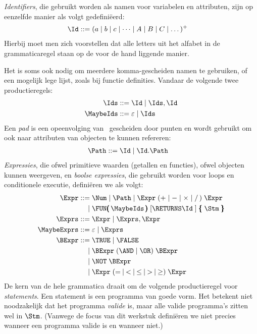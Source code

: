\emph{Identifiers}, die gebruikt worden als namen voor variabelen en attributen, zijn op eenzelfde manier als volgt gedefiniëerd:
%
\begin{align*}
  \Id \GrammarDef (a \mid b \mid c \mid \dots \mid A \mid B \mid C \mid \dots)^+
\end{align*}
%
Hierbij moet men zich voorstellen dat alle letters uit het alfabet in de grammaticaregel staan op de voor de hand liggende manier.

Het is soms ook nodig om meerdere komma-gescheiden namen te gebruiken, of een mogelijk lege lijst, zoals bij functie definities. Vandaar de volgende twee productieregels:
%
\begin{align*}
  \Ids \GrammarDef \Id \mid \Ids, \Id \\
  \MaybeIds \GrammarDef \varepsilon \mid \Ids
\end{align*}
%
Een \emph{pad} is een opeenvolging van \Ids\ gescheiden door punten en wordt gebruikt om ook naar attributen van objecten te kunnen refereren:
%
\begin{align*}
  \Path \GrammarDef \Id \mid \Id . \Path
\end{align*}
%
\emph{Expressies}, die ofwel primitieve waarden (getallen en functies), ofwel objecten kunnen weergeven, en \emph{boolse expressies}, die gebruikt worden voor loops en conditionele executie, definiëren we als volgt:
%
\begin{align*}
  \Expr \GrammarDef \Num \mid \Path \mid \Expr\; (+ \mid - \mid \times \mid /\,)\; \Expr \\
  \GrammarOr \FUN\pmb{(}\,\MaybeIds\,\pmb{)}\; \GrammarOpt{\RETURNS \Id\;} \pmb{\{}\; \Stm\; \pmb{\}} \\
  \Exprs \GrammarDef \Expr \mid \Exprs, \Expr \\
  \MaybeExprs \GrammarDef \varepsilon \mid \Exprs \\
  \BExpr \GrammarDef \TRUE \mid \FALSE \\
  \GrammarOr \BExpr\; (\AND \mid \OR)\; \BExpr \\
  \GrammarOr \NOT\; \BExpr \\
  \GrammarOr \Expr\; (=\: \mid\: <\: \mid\: \le\: \mid\: >\: \mid\: \ge)\; \Expr
\end{align*}
%
De kern van de hele grammatica draait om de volgende productieregel voor \emph{statements}. Een statement is een programma van goede vorm. Het betekent niet noodzakelijk dat het programma \emph{valide} is, maar alle valide programma's zitten wel in $\Stm$. (Vanwege de focus van dit werkstuk definiëren we niet precies wanneer een programma valide is en wanneer niet.)
